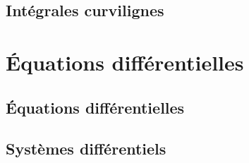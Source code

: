 \chapter{Intégrales curvilignes}




\part{Équations différentielles}
\chapter{Équations différentielles}
\chapter{Systèmes différentiels}

